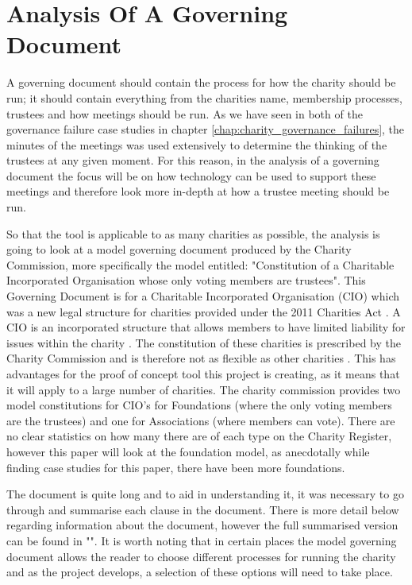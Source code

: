\documentclass{UoYCSproject}
\begin{document}
\section{Analysis Of A Governing Document}
\label{sec:analyisis_governing_doc}
A governing document should contain the process for how the charity should be run; it should contain everything from the charities name, membership processes, trustees and how meetings should be run. As we have seen in both of the governance failure case studies in chapter \ref{chap:charity_governance_failures}, the minutes of the meetings was used extensively to determine the thinking of the trustees at any given moment. For this reason, in the analysis of a governing document the focus will be on how technology can be used to support these meetings and therefore look more in-depth at how a trustee meeting should be run. 

So that the tool is applicable to as many charities as possible, the analysis is going to look at a model governing document produced by the Charity Commission, more specifically the model entitled: "Constitution of a Charitable Incorporated Organisation whose only voting members are trustees"\cite{charity_constitution_cio}. This Governing Document is for a Charitable Incorporated Organisation (CIO) which was a new legal structure for charities provided under the 2011 Charities Act \cite{charities_act_2011_section_204_cio}. A CIO is an incorporated structure that allows members to have limited liability for issues within the charity \cite{vistra_2019}. The constitution of these charities is prescribed by the Charity Commission and is therefore not as flexible as other charities \cite{vistra_2019}. This has advantages for the proof of concept tool this project is creating, as it means that it will apply to a large number of charities. The charity commission provides two model constitutions for CIO's for Foundations (where the only voting members are the trustees) and one for Associations (where members can vote). There are no clear statistics on how many there are of each type on the Charity Register, however this paper will look at the foundation model, as anecdotally while finding case studies for this paper, there have been more foundations. 

The document is quite long and to aid in understanding it, it was necessary to go through and summarise each clause in the document. There is more detail below regarding information about the document, however the full summarised version can be found in "". It is worth noting that in certain places the model governing document allows the reader to choose different processes for running the charity and as the project develops, a selection of these options will need to take place.
\end{document}
